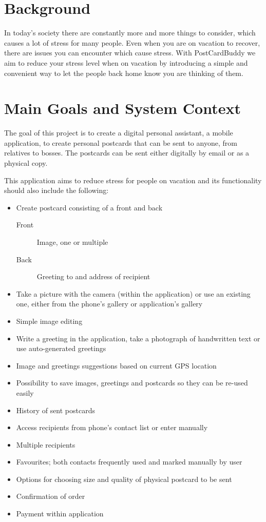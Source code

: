 \documentclass[10pt,a4paper]{article}
\begin{document}
\section{Background}

In today's society there are constantly more and more things to consider, which causes a lot of stress for many people. Even when you are on vacation to recover, there are issues you can encounter which cause stress. With PostCardBuddy we aim to reduce your stress level when on vacation by introducing a simple and convenient way to let the people back home know you are thinking of them. 


\section{Main Goals and System Context}
The goal of this project is to create a digital personal assistant, a mobile application, to create personal postcards that can be sent to anyone, from relatives to bosses. The postcards can be sent either digitally by email or as a physical copy. 

This application aims to reduce stress for people on vacation and its functionality should also include the following:

\begin{itemize}
\item Create postcard consisting of a front and back
\begin{description}
\item[Front] Image, one or multiple
\item[Back] Greeting to and address of recipient
\end{description}
\item Take a picture with the camera (within the application) or use an existing one, either from the phone's gallery or application's gallery
\item Simple image editing
\item Write a greeting in the application, take a photograph of handwritten text or use auto-generated greetings
\item Image and greetings suggestions based on current GPS location
\item Possibility to save images, greetings and postcards so they can be re-used easily
\item History of sent postcards
\item Access recipients from phone's contact list or enter manually
\item Multiple recipients
\item Favourites; both contacts frequently used and marked manually by user
\item Options for choosing size and quality of physical postcard to be sent
\item Confirmation of order
\item Payment within application
\end{itemize}
\end{document}
